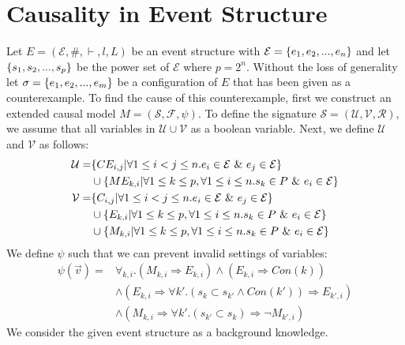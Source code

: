 \documentclass{article}
\begin{document}
\section{Causality in Event Structure}
Let $E = (\mathcal{E},\#,\vdash,l,L)$ be an event structure with
$\mathcal{E} = \{e_1, e_2, ...,e_n\}$ and let $\{s_1,s_2,...,s_p\}$ be the power set of $\mathcal{E}$ where $p = 2^n$.
Without the loss of generality let $\sigma = \{e_1,e_2,...,e_m\}$ be a configuration of $E$ that
has been given as a counterexample.
To find the cause of this counterexample, first we construct an extended causal model $M = (\mathcal{S},\mathcal{F},\psi)$.
To define the signature $\mathcal{S} = (\mathcal{U},\mathcal{V},\mathcal{R})$, we assume that all variables in $\mathcal{U} \cup \mathcal{V}$ as a boolean variable.
Next, we define $\mathcal{U}$ and $\mathcal{V}$ as follows:
\begin{align*}
    \mathcal{U} = & \{CE_{i,j} | \forall 1 \leq i < j \leq n. e_i \in \mathcal{E} \ \& \  e_j \in \mathcal{E}\}                    \\
                  & \cup \{ME_{k,i} | \forall 1 \leq k \leq p , \forall 1 \leq i \leq n . s_k \in P \ \& \  e_i \in \mathcal{E} \} \\
    \mathcal{V} = & \{C_{i,j} | \forall 1 \leq i < j \leq n. e_i \in \mathcal{E} \ \& \  e_j \in \mathcal{E}\}                     \\
                  & \cup \{E_{k,i} | \forall 1 \leq k \leq p , \forall 1 \leq i \leq n . s_k \in P \ \& \  e_i \in \mathcal{E} \}  \\
                  & \cup \{M_{k,i} | \forall 1 \leq k \leq p , \forall 1 \leq i \leq n . s_k \in P \ \& \  e_i \in \mathcal{E} \}  \\
\end{align*}
We define $\psi$ such that we can prevent invalid settings of variables:
\begin{align*}
    \psi(\vec v) = & \forall_{k,i}.
    \left(
    M_{k,i} \Rightarrow E_{k,i}
    \right)
    \wedge
    \left(
    E_{k,i} \Rightarrow Con(k)
    \right)
    \\
                   & \wedge \left(E_{k,i} \Rightarrow
    \forall k'. (s_k \subset s_{k'} \wedge Con(k')) \Rightarrow E_{k',i}
    \right)                                           \\
                   & \wedge \left(
    M_{k,i} \Rightarrow \forall k'.
    (s_{k'} \subset s_k) \Rightarrow \neg M_{k',i}
    \right)
\end{align*}
We consider the given event structure as a background knowledge.
\end{document}
